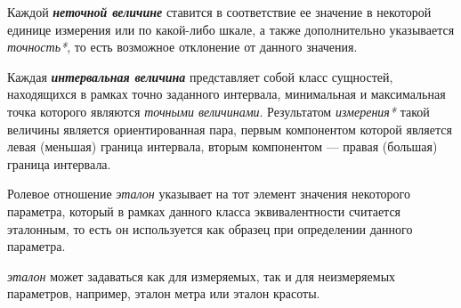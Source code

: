 \begin{SCn}
\begin{SCn}
\begin{SCn}
\end{SCn}

Каждой \textbf{\textit{неточной величине}} ставится в соответствие ее значение в некоторой единице измерения или по какой-либо шкале, а также дополнительно указывается \textit{точность*}, то есть возможное отклонение от данного значения.

\begin{SCn}
\end{SCn}

Каждая \textbf{\textit{интервальная величина}} представляет собой класс сущностей, находящихся в рамках точно заданного интервала, минимальная и максимальная точка которого являются \textit{точными величинами}. Результатом \textit{измерения*} такой величины является ориентированная пара, первым компонентом которой является левая (меньшая) граница интервала, вторым компонентом --- правая (большая) граница интервала.

\begin{SCn}
\end{SCn}

\begin{SCn}
Ролевое отношение \textit{эталон\scnrolesign} указывает на тот элемент значения некоторого параметра, который в рамках данного класса эквивалентности считается эталонным, то есть он используется как образец при определении данного параметра.
\end{SCn}
		
\begin{SCn}
\textit{эталон\scnrolesign} может задаваться как для измеряемых, так и для неизмеряемых параметров, например, эталон метра или эталон красоты.
\end{SCn}
	
\begin{SCn}
\end{SCn}


\end{SCn}
\end{SCn}
